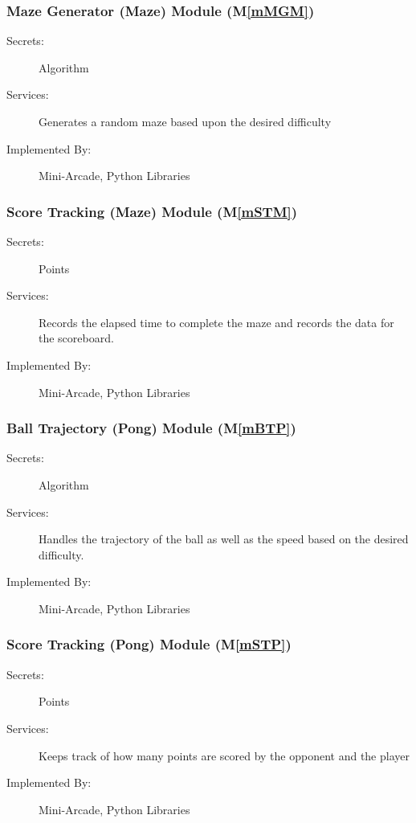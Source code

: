 \documentclass[12pt, titlepage]{article}
\newcommand{\mref}[1]{M\ref{#1}}
\begin{document}
\subsubsection{Maze Generator (Maze) Module (\mref{mMGM})}
\begin{description}
\item[Secrets:] Algorithm
\item[Services:] Generates a random maze based upon the desired difficulty 
\item[Implemented By:] Mini-Arcade, Python Libraries
\end{description}

\subsubsection{Score Tracking (Maze) Module (\mref{mSTM})}
\begin{description}
\item[Secrets:] Points
\item[Services:] Records the elapsed time to complete the maze and records the data for the scoreboard.
\item[Implemented By:] Mini-Arcade, Python Libraries
\end{description}

\subsubsection{Ball Trajectory (Pong) Module (\mref{mBTP})}
\begin{description}
\item[Secrets:] Algorithm
\item[Services:] Handles the trajectory of the ball as well as the speed based on the desired difficulty.
\item[Implemented By:] Mini-Arcade, Python Libraries
\end{description}

\subsubsection{Score Tracking (Pong) Module (\mref{mSTP})}
\begin{description}
\item[Secrets:] Points
\item[Services:] Keeps track of how many points are scored by the opponent and the player 
\item[Implemented By:] Mini-Arcade, Python Libraries
\end{description}
\end{document}
